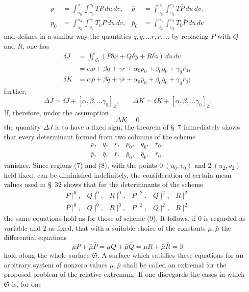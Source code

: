 \documentclass[11pt,a4paper,leqno]{article}
\begin{document}
\[
\begin{aligned}
p&=\int_{u_0}^{u_1}\!\int_{v_0}^{v_1}TP\,du\,dv,
&\bar p&=\int_{u_0}^{u_1}\!\int_{v_0}^{v_1}T\bar P\,du\,dv,\\
p_0&=\int_{u_2}^{u_3}\!\int_{v_2}^{v_3}T_0P\,du\,dv,
&\bar p_0&=\int_{u_2}^{u_3}\!\int_{v_2}^{v_3}T_0\bar P\,du\,dv
\end{aligned}
\]
and defines in a similar way the quantities $q,\bar q,\ldots r,\bar r,\ldots$
by replacing $P$ with $Q$ and $R$, one has
\[
\begin{aligned}
\delta J
&=\iint_{\mathfrak{S}}(P\delta x+Q\delta y+R\delta z)\,du\,dv\\
&=\alpha p+\beta q+\gamma r+\alpha_0p_0+\beta_0q_0+\gamma_0r_0,\\
\delta K
&=\alpha\bar p+\beta\bar q+\gamma\bar r
+\alpha_0\bar p_0+\beta_0\bar q_0+\gamma_0\bar r_0;
\end{aligned}
\]
further,
\[
\Delta J=\delta J+[\alpha,\beta,\ldots\gamma_0]_2,
\qquad
\Delta K=\delta K+[\alpha,\beta,\ldots\gamma_0]_2.
\]
If, therefore, under the assumption
\[
\Delta K=0
\]
the quantity $\Delta J$ is to have a fixed sign, the theorem of \S~7
immediately shows that every determinant formed from two columns
of the scheme
\begin{equation}\tag{9}
\begin{array}{cccccc}
p,&q,&r,&p_0,&q_0,&r_0,\\
\bar p,&\bar q,&\bar r,&\bar p_0,&\bar q_0,&\bar r_0,
\end{array}
\end{equation}
vanishes. Since regions (7) and (8), with the points $0\ (u_0,v_0)$
and $2\ (u_2,v_2)$ held fixed, can be diminished indefinitely, the
consideration of certain mean values used in \S~32 shows that for
the determinants of the scheme
\[
\begin{array}{cccccc}
P\!\mid^0,&Q\!\mid^0,&R\!\mid^0,&P\!\mid^2,&Q\!\mid^2,&R\!\mid^2\\
\bar P\!\mid^0,&\bar Q\!\mid^0,&\bar R\!\mid^0,
&\bar P\!\mid^2,&\bar Q\!\mid^2,&\bar R\!\mid^2
\end{array}
\]
the same equations hold as for those of scheme (9). It follows,
if 0 is regarded as variable and 2 as fixed, that with a suitable
choice of the constants $\mu,\bar\mu$ the differential equations
\[
\mu P+\bar\mu\bar P
=\mu Q+\bar\mu\bar Q
=\mu R+\bar\mu\bar R=0
\]
hold along the whole surface $\mathfrak{S}$. A surface which satisfies these
equations for an arbitrary system of nonzero values $\mu,\bar\mu$ shall
be called an extremal for the proposed problem of the relative extremum.
If one disregards the cases in which $\mathfrak{S}$ is, for one
\end{document}
